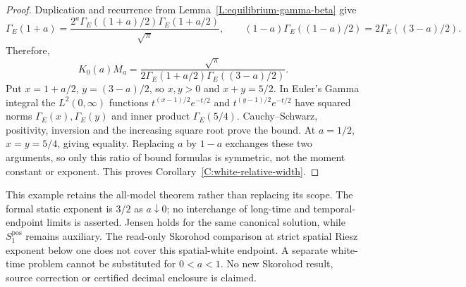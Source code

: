 \begin{proof}
  Duplication and recurrence from Lemma~\ref{L:equilibrium-gamma-beta} give
  \[
    \Gamma_E(1+a)
    =\frac{2^a\Gamma_E((1+a)/2)\Gamma_E(1+a/2)}{\sqrt\pi},
    \qquad
    (1-a)\Gamma_E((1-a)/2)=2\Gamma_E((3-a)/2).
  \]
  Therefore,
  \[
    K_0(a)M_a
    =\frac{\sqrt\pi}{2\Gamma_E(1+a/2)\Gamma_E((3-a)/2)} .
  \]
  Put $x = 1+a/2$, $y = (3-a)/2$, so $x,y > 0$ and $x+y = 5/2$. In Euler's Gamma
  integral the $L^2(0,\infty)$ functions $t^{(x-1)/2}e^{-t/2}$ and
  $t^{(y-1)/2}e^{-t/2}$ have squared norms $\Gamma_E(x),\Gamma_E(y)$ and inner
  product $\Gamma_E(5/4)$. Cauchy--Schwarz, positivity, inversion and the
  increasing square root prove the bound. At $a = 1/2$, $x = y = 5/4$, giving
  equality. Replacing $a$ by $1-a$ exchanges these two arguments, so only this
  ratio of bound formulas is symmetric, not the moment constant or exponent.
  This proves Corollary~\ref{C:white-relative-width}.
\end{proof}

This example retains the all-model theorem rather than replacing its scope. The
formal static exponent is $3/2$ as $a\downarrow0$; no interchange of long-time
and temporal-endpoint limits is asserted. Jensen holds for the same canonical
solution, while $S_1^{\mathrm{pos}}$ remains auxiliary. The read-only Skorohod
comparison at strict spatial Riesz exponent below one does not cover this
spatial-white endpoint. A separate white-time problem cannot be substituted for
$0 < a < 1$. No new Skorohod result, source correction or certified decimal
enclosure is claimed.
